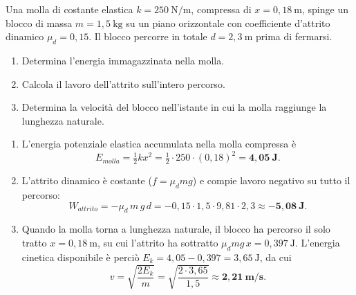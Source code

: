 \begin{question}[ID=3.4, subtitle={Molla che spinge un blocco su piano con attrito}, tags={conservazione energia, molla, attrito}, difficulty=media]
Una molla di costante elastica $k = 250\ \text{N/m}$, compressa di $x = 0{,}18\ \text{m}$, spinge un blocco di massa $m = 1{,}5\ \text{kg}$ su un piano orizzontale con coefficiente d'attrito dinamico $\mu_d = 0{,}15$. Il blocco percorre in totale $d = 2{,}3\ \text{m}$ prima di fermarsi.
\begin{enumerate}
    \item Determina l'energia immagazzinata nella molla.
    \item Calcola il lavoro dell'attrito sull'intero percorso.
    \item Determina la velocità del blocco nell'istante in cui la molla raggiunge la lunghezza naturale.
\end{enumerate}
\begin{solution}
\begin{enumerate}
    \item L'energia potenziale elastica accumulata nella molla compressa è
    \[
    E_{molla} = \tfrac{1}{2}kx^2 = \tfrac{1}{2}\cdot 250\cdot (0{,}18)^2 = \mathbf{4{,}05\ \text{J}}.
    \]
    \item L'attrito dinamico è costante ($f = \mu_d mg$) e compie lavoro negativo su tutto il percorso:
    \[
    W_{attrito} = -\mu_d\,m\,g\,d = -0{,}15\cdot 1{,}5\cdot 9{,}81\cdot 2{,}3 \approx \mathbf{-5{,}08\ \text{J}}.
    \]
    \item Quando la molla torna a lunghezza naturale, il blocco ha percorso il solo tratto $x = 0{,}18\ \text{m}$, su cui l'attrito ha sottratto $\mu_d mg\,x = 0{,}397\ \text{J}$. L'energia cinetica disponibile è perciò $E_k = 4{,}05 - 0{,}397 = 3{,}65\ \text{J}$, da cui
    \[
    v = \sqrt{\frac{2E_k}{m}} = \sqrt{\frac{2\cdot 3{,}65}{1{,}5}} \approx \mathbf{2{,}21\ \text{m/s}}.
    \]
\end{enumerate}
\end{solution}
\end{question}


